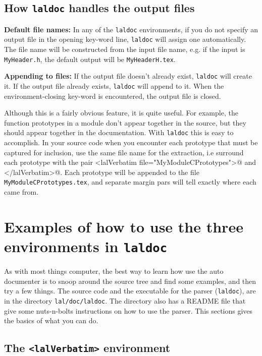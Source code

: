 \documentclass[oneside]{book}
\begin{document}
\subsection{ How {\texttt {laldoc}} handles the output files}

{\bf Default file names:} In any of the {\texttt {laldoc}} environments,
if you do not specify an output file in the opening key-word line,
{\texttt {laldoc}} will assign one automatically. The file name will
be constructed from the input file name, e.g. if the input
is  {\tt MyHeader.h}, the default output will be {\tt MyHeaderH.tex}.

{\bf Appending to files:}
If the output file doesn't already exist, {\texttt {laldoc}} will
create it.  If the output file already exists, {\texttt {laldoc}} will
append to it.  When the environment-closing key-word is encountered,
the output file is closed.

Although this is a fairly obvious feature, it is quite useful.  For
example, the function prototypes in a module don't appear together in
the source, but they should appear together in the documentation.
With {\texttt {laldoc}} this is easy to accomplish. In your source
code when you encounter each prototype that must be captured for
inclusion, use the same file name for the extraction, i.e surround
each prototype with
the pair {\verb@<lalVerbatim file="MyModuleCPrototypes">@}  and
{\verb@</lalVerbatim>@}.  Each prototype will be appended to the file
{\tt MyModuleCPrototypes.tex}, and separate margin pars will tell 
exactly where each came from.





\section{Examples of how to use the three environments in {\texttt {laldoc}} }

As with most things computer, the best way to learn how use the auto
documenter is to snoop around the source tree and find some examples,
and then try a few things.  The source code and the executable for the
parser ({\tt laldoc}), are in the directory {\tt lal/doc/laldoc}.  The
directory also has a README file that give some nuts-n-bolts
instructions on how to use the parser.  This sections gives the basics
of what you can do.


\subsection{The {\texttt {<lalVerbatim>} }  environment }
\end{document}
